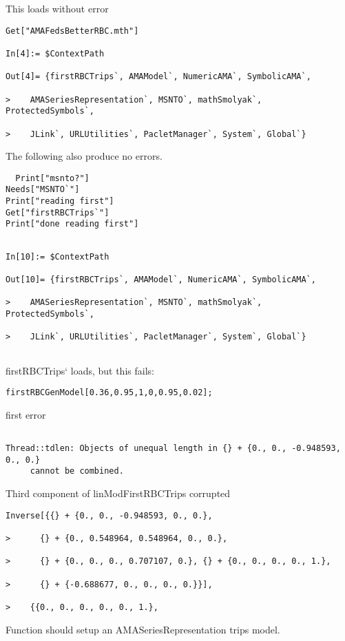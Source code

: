 \documentclass[hyperref,idxtotoc]{labbook}
\begin{document}
\begin{description}[style=nextline]
\item[AMAFedsBetterRBC.mth]

This loads without error
\begin{verbatim}
Get["AMAFedsBetterRBC.mth"]

In[4]:= $ContextPath

Out[4]= {firstRBCTrips`, AMAModel`, NumericAMA`, SymbolicAMA`, 
 
>    AMASeriesRepresentation`, MSNTO`, mathSmolyak`, ProtectedSymbols`, 
 
>    JLink`, URLUtilities`, PacletManager`, System`, Global`}

\end{verbatim}


The following also produce no errors.

\begin{verbatim}
  Print["msnto?"]
Needs["MSNTO`"]
Print["reading first"]
Get["firstRBCTrips`"]
Print["done reading first"]
\end{verbatim}
\end{description}


\begin{verbatim}

In[10]:= $ContextPath

Out[10]= {firstRBCTrips`, AMAModel`, NumericAMA`, SymbolicAMA`, 
 
>    AMASeriesRepresentation`, MSNTO`, mathSmolyak`, ProtectedSymbols`, 
 
>    JLink`, URLUtilities`, PacletManager`, System`, Global`}


\end{verbatim}

firstRBCTrips` loads, but this fails:
\begin{verbatim}
firstRBCGenModel[0.36,0.95,1,0,0.95,0.02];
\end{verbatim}

first error
\begin{verbatim}

Thread::tdlen: Objects of unequal length in {} + {0., 0., -0.948593, 0., 0.}
     cannot be combined.

\end{verbatim}

Third component of linModFirstRBCTrips corrupted
\begin{verbatim}
Inverse[{{} + {0., 0., -0.948593, 0., 0.}, 
 
>      {} + {0., 0.548964, 0.548964, 0., 0.}, 
 
>      {} + {0., 0., 0., 0.707107, 0.}, {} + {0., 0., 0., 0., 1.}, 
 
>      {} + {-0.688677, 0., 0., 0., 0.}}], 
 
>    {{0., 0., 0., 0., 0., 1.}, 
\end{verbatim}
Function should setup an AMASeriesRepresentation trips model.
\end{document}
